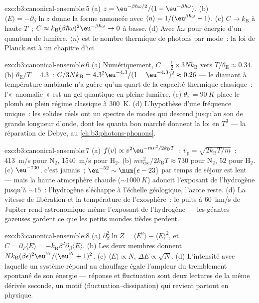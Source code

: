 \begin{solution}{exo:b3:canonical-ensemble:5}
(a) $z = \eu^{-\beta\hbar\omega/2}/(1 - \eu^{-\beta\hbar\omega})$.
(b) $\langle E\rangle = -\partial_\beta\ln z$ donne la forme annoncée
avec $\langle n\rangle = 1/(\eu^{\beta\hbar\omega} - 1)$. (c)
$C \to k_{\text{B}}$ à haute $T$~; $C \approx k_{\text{B}}(\beta
\hbar\omega)^2\eu^{-\beta\hbar\omega} \to 0$ à basse. (d) Avec
$\hbar\omega$ pour énergie d'un quantum de lumière, $\langle n\rangle$
est le nombre thermique de photons par mode~: la loi de Planck est à
un chapitre d'ici.
\end{solution}

\begin{solution}{exo:b3:canonical-ensemble:6}
(a) Numériquement, $C = \tfrac12 \times 3Nk_{\text{B}}$ vers
$T/\theta_{\text{E}} \approx 0.34$. (b) $\theta_{\text{E}}/T =
4.3$~: $C/3Nk_{\text{B}} = 4.3^2\eu^{-4.3}/(1 - \eu^{-4.3})^2
\approx 0.26$ --- le diamant à température ambiante n'a guère qu'un
quart de la capacité thermique classique~: l'«~anomalie~» est un gel
quantique en pleine lumière. (c) $\theta_{\text{E}} = \qty{90}{K}$
place le plomb en plein régime classique à \qty{300}{K}. (d)
L'hypothèse d'une fréquence unique~: les solides réels ont un spectre
de modes qui descend jusqu'au son de grande longueur d'onde, dont les
quanta bon marché donnent la loi en $T^3$ --- la réparation de Debye,
au \cref{ch:b3:photons-phonons}.
\end{solution}

\begin{solution}{exo:b3:canonical-ensemble:7}
(a) $f(v) \propto v^2\eu^{-mv^2/2k_{\text{B}}T}$~: $v_{\text{p}} =
\sqrt{2k_{\text{B}}T/m}$~: \qty{413}{m/s} pour N$_2$,
\qty{1540}{m/s} pour H$_2$. (b) $mv_{\text{esc}}^2/2k_{\text{B}}T
\approx 730$ pour N$_2$, $52$ pour H$_2$. (c) $\eu^{-730}$, c'est
jamais~; $\eu^{-52} \sim \num{e-23}$ par temps de séjour est lent ---
mais la haute atmosphère chaude ($\sim\qty{1000}{K}$) adoucit
l'exposant de l'hydrogène jusqu'à $\sim15$~: l'hydrogène s'échappe à
l'échelle géologique, l'azote reste. (d) La vitesse de libération et
la température de l'exosphère~: le puits à \qty{60}{km/s} de Jupiter
rend astronomique même l'exposant de l'hydrogène --- les géantes
gazeuses gardent ce que les petits mondes tièdes perdent.
\end{solution}

\begin{solution}{exo:b3:canonical-ensemble:8}
(a) $\partial_\beta^2\ln Z = \langle E^2\rangle - \langle
E\rangle^2$, et $C = \partial_T\langle E\rangle =
-k_{\text{B}}\beta^2\partial_\beta\langle E\rangle$. (b) Les deux
membres donnent $Nk_{\text{B}}(\beta\epsilon)^2\eu^{\beta\epsilon}/(
\eu^{\beta\epsilon} + 1)^2$. (c) $\langle E\rangle \propto N$,
$\Delta E \propto \sqrt N$. (d) L'intensité avec laquelle un système
répond au chauffage égale l'ampleur du tremblement spontané de son
énergie --- réponse et fluctuation sont deux lectures de la même
dérivée seconde, un motif (fluctuation--dissipation) qui revient
partout en physique.
\end{solution}

